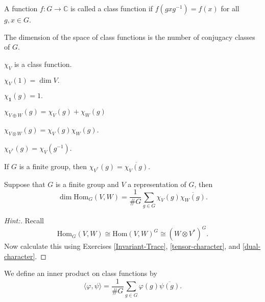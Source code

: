 \documentclass[11pt]{article}
\begin{document}
\begin{definition}
A function $f: G \rightarrow \mathbb{C}$ is called a class function if $f(gxg^{-1}) = f(x)$ for all $g, x \in G$.
\end{definition}

\begin{exercise}
The dimension of the space of class functions is the number of conjugacy classes of $G$.
\end{exercise}

\begin{exercise}
$\chi_V$ is a class function.
\end{exercise}

\begin{exercise}
$\chi_V(1) = \dim V.$
\end{exercise}

\begin{exercise}
$\chi_{\mathbf{1}}(g) = 1.$
\end{exercise}

\begin{exercise}
$\chi_{V \oplus W}(g) = \chi_V(g) + \chi_W(g)$
\end{exercise}

\begin{exercise} \label{tensor-character}
$\chi_{V \otimes W}(g) = \chi_V(g)  \chi_W(g)$.
\end{exercise}

\begin{exercise}
$\chi_{V^*}(g) = \chi_V(g^{-1})$.
\end{exercise}

\begin{exercise} \label{dual-character}
If $G$ is a finite group, then $\chi_{V^*}(g) = \overline{\chi_V(g)}$.
\end{exercise}


\begin{exercise}
Suppose that $G$ is a finite group and $V$ a representation of $G$, then
$$\dim \mathrm{Hom}_G(V,W) = \frac{1}{\# G} \sum_{g \in G} \chi_V(g) \overline{\chi_W(g)}.$$
\end{exercise}
\begin{proof}[Hint:]
Recall $$\mathrm{Hom}_G(V,W) \cong \mathrm{Hom}(V,W)^G \cong (W \otimes V^*)^G.$$  Now calculate this using Exercises \ref{Invariant-Trace}, \ref{tensor-character}, and \ref{dual-character}.
\end{proof}

\begin{definition}
We define an inner product on class functions by
$$\langle \varphi, \psi \rangle = \frac{1}{\# G} \sum_{g \in G} \varphi(g) \overline{\psi(g)}.$$
\end{definition}
\end{document}
